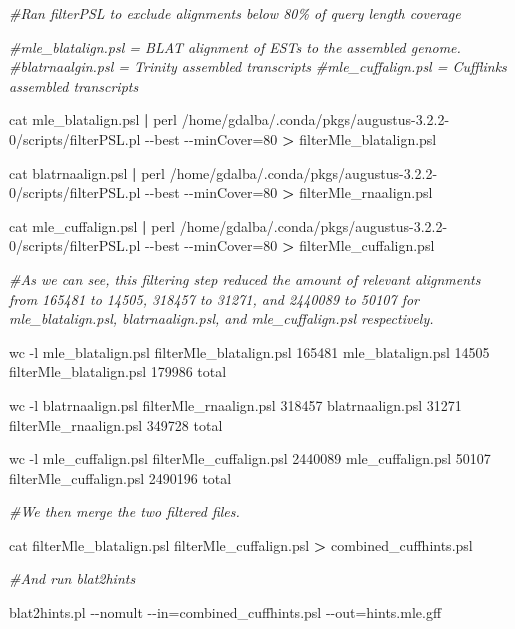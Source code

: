 \documentclass[
]{article}
\newenvironment{Shaded}{\begin{snugshade}}{\end{snugshade}}
\newcommand{\CommentTok}[1]{\textcolor[rgb]{0.56,0.35,0.01}{\textit{#1}}}
\newcommand{\ExtensionTok}[1]{#1}
\newcommand{\FunctionTok}[1]{\textcolor[rgb]{0.00,0.00,0.00}{#1}}
\newcommand{\KeywordTok}[1]{\textcolor[rgb]{0.13,0.29,0.53}{\textbf{#1}}}
\newcommand{\NormalTok}[1]{#1}
\newcommand{\OperatorTok}[1]{\textcolor[rgb]{0.81,0.36,0.00}{\textbf{#1}}}
\begin{document}
\begin{Shaded}
\begin{Highlighting}[]

\CommentTok{\#Ran filterPSL to exclude alignments below 80\% of query length coverage}

\CommentTok{\#mle\_blatalign.psl = BLAT alignment of ESTs to the assembled genome.}
\CommentTok{\#blatrnaalgin.psl = Trinity assembled transcripts}
\CommentTok{\#mle\_cuffalign.psl = Cufflinks assembled transcripts}

\FunctionTok{cat}\NormalTok{ mle\_blatalign.psl }\KeywordTok{|} \FunctionTok{perl}\NormalTok{ /home/gdalba/.conda/pkgs/augustus{-}3.2.2{-}0/scripts/filterPSL.pl {-}{-}best {-}{-}minCover=80 }\OperatorTok{\textgreater{}}\NormalTok{ filterMle\_blatalign.psl}

\FunctionTok{cat}\NormalTok{ blatrnaalign.psl }\KeywordTok{|} \FunctionTok{perl}\NormalTok{ /home/gdalba/.conda/pkgs/augustus{-}3.2.2{-}0/scripts/filterPSL.pl {-}{-}best {-}{-}minCover=80 }\OperatorTok{\textgreater{}}\NormalTok{ filterMle\_rnaalign.psl}

\FunctionTok{cat}\NormalTok{ mle\_cuffalign.psl }\KeywordTok{|} \FunctionTok{perl}\NormalTok{ /home/gdalba/.conda/pkgs/augustus{-}3.2.2{-}0/scripts/filterPSL.pl {-}{-}best {-}{-}minCover=80 }\OperatorTok{\textgreater{}}\NormalTok{ filterMle\_cuffalign.psl}

\CommentTok{\#As we can see, this filtering step reduced the amount of relevant alignments from 165481 to 14505, 318457 to 31271, and 2440089 to 50107 for mle\_blatalign.psl, blatrnaalign.psl, and mle\_cuffalign.psl respectively.}

\FunctionTok{wc}\NormalTok{ {-}l mle\_blatalign.psl filterMle\_blatalign.psl}
  \ExtensionTok{165481}\NormalTok{ mle\_blatalign.psl}
   \ExtensionTok{14505}\NormalTok{ filterMle\_blatalign.psl}
  \ExtensionTok{179986}\NormalTok{ total}
  
\FunctionTok{wc}\NormalTok{ {-}l blatrnaalign.psl filterMle\_rnaalign.psl}
  \ExtensionTok{318457}\NormalTok{ blatrnaalign.psl}
   \ExtensionTok{31271}\NormalTok{ filterMle\_rnaalign.psl}
  \ExtensionTok{349728}\NormalTok{ total}

\FunctionTok{wc}\NormalTok{ {-}l mle\_cuffalign.psl filterMle\_cuffalign.psl}
  \ExtensionTok{2440089}\NormalTok{ mle\_cuffalign.psl}
    \ExtensionTok{50107}\NormalTok{ filterMle\_cuffalign.psl}
  \ExtensionTok{2490196}\NormalTok{ total}

\CommentTok{\#We then merge the two filtered files.}

\FunctionTok{cat}\NormalTok{ filterMle\_blatalign.psl filterMle\_cuffalign.psl }\OperatorTok{\textgreater{}}\NormalTok{ combined\_cuffhints.psl}

\CommentTok{\#And run blat2hints}

\ExtensionTok{blat2hints.pl}\NormalTok{ {-}{-}nomult {-}{-}in=combined\_cuffhints.psl {-}{-}out=hints.mle.gff}
\end{Highlighting}
\end{Shaded}
\end{document}
